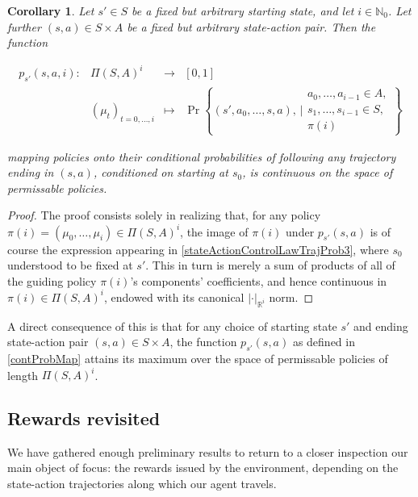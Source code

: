 \documentclass[11pt]{article} %
\newtheorem{cor}{Corollary}
\begin{document}
\begin{cor}\label{corContProbMap}
	Let $s' \in S$ be a fixed but arbitrary starting state, and let $i \in \mathbb{N}_0$. Let further $(s,a) \in S \times A$ be a fixed but arbitrary state-action pair. Then the function

\begin{equation}\label{contProbMap}
	\begin{array}{rccl}
		p_{s'}(s,a,i): 	& \Pi(S,A)^i 			& \rightarrow 	& [0,1] \\
					& (\mu_t)_{t=0,\dots,i} 	& \mapsto 	& \Pr\left\{  (s',a_0,\dots,s,a), \, \Bigg| \begin{array}{lr}
																					a_0, \dots, a_{i-1} \in A, \\
																					s_1,\dots,s_{i-1} \in S, \\
																					\pi(i)
																					\end{array} \right\}
	\end{array}
\end{equation}

mapping policies onto their conditional probabilities of following \textit{any} trajectory ending in $(s,a)$, conditioned on starting at $s_0$, is continuous on the space of permissable policies.
\end{cor}

\begin{proof}
	The proof consists solely in realizing that, for any policy $\pi(i) = (\mu_0,\dots,\mu_i) \in \Pi(S,A)^i$, the image of $\pi(i)$ under $p_{s'}(s,a)$ is of course the expression appearing in \ref{stateActionControlLawTrajProb3}, where $s_0$ understood to be fixed at $s'$. This in turn is merely a sum of products of all of the guiding policy $\pi(i)$'s components' coefficients, and hence continuous in $\pi(i) \in \Pi(S,A)^i$, endowed with its canonical $| \cdot |_{\mathbb{R}^i}$ norm.
\end{proof}

A direct consequence of this is that for any choice of starting state $s'$ and ending state-action pair $(s,a) \in S \times A$, the function $p_{s'}(s,a)$ as defined in \ref{contProbMap} attains its maximum over the space of permissable policies of length $\Pi(S,A)^i$.

\subsection{Rewards revisited}

We have gathered enough preliminary results to return to a closer inspection our main object of focus: the rewards issued by the environment, depending on the state-action trajectories along which our agent travels.
\end{document}
